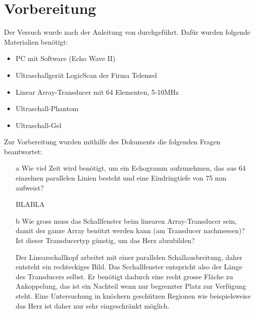 \documentclass[11pt]{scrartcl}
\begin{document}

    \section{Vorbereitung}
   
    Der Versuch wurde nach der Anleitung von \cite{Echographie} durchgeführt.
    Dafür wurden folgende Materialien benötigt:

    \begin{itemize}
        \item PC mit Software (Echo Wave II)
        \item Ultraschallgerät LogicScan der Firma Telemed
        \item Linear Array-Transducer mit 64 Elementen, 5-10MHz
        \item Ultraschall-Phantom
        \item Ultraschall-Gel
        
    \end{itemize}

    Zur Vorbereitung wurden mithilfe des Dokuments \cite{medUS} die folgenden Fragen beantwortet: %

    \begin{itemize}
        \item[a] Wie viel Zeit wird benötigt, um ein Echogramm aufzunehmen, das aus 64 einzelnen parallelen Linien besteht und eine Eindringtiefe von 75 mm aufweist?
        \item[]  BLABLA
        \item[b] Wie gross muss das Schallfenster beim linearen Array-Transducer sein, damit der ganze Array benützt werden kann (am Transducer nachmessen)?
                 Ist dieser Transducertyp günstig, um das Herz abzubilden?
        \item[]  Der Linearschallkopf arbeitet mit einer parallelen Schallausbreitung, daher entsteht ein
        rechteckiges Bild. Das Scchallfenster entspricht also der Länge des Transducers selbst. Er benötigt dadurch
        eine recht grosse Fläche zu Ankoppelung, das ist ein Nachteil wenn nur begrenzter Platz zur Verfügung steht. Eine Untersuchung in knöchern geschützen Regionen wie
        beispielsweise das Herz ist daher nur sehr eingeschränkt möglich.
    \end{itemize}
\end{document}
